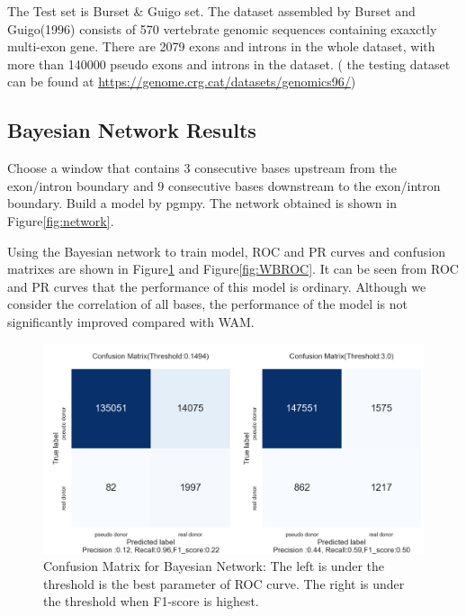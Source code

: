 \documentclass{gapd}
\begin{document}
The Test set is Burset \& Guigo set. The dataset assembled by Burset
and Guigo(1996) consists of 570 vertebrate genomic sequences containing
exaxctly multi-exon gene. There are 2079 exons and introns in the whole
dataset, with more than 140000 pseudo exons and introns in the dataset.
( the testing dataset can be found at
\url{https://genome.crg.cat/datasets/genomics96/})



\subsection{Bayesian Network Results}\label{bayesian-network-results}


Choose a window that contains 3 consecutive bases upstream from the
exon/intron boundary and 9 consecutive bases downstream to the
exon/intron boundary. Build a model by pgmpy. The network obtained is
shown in Figure\ref{fig:network}.



Using the Bayesian network to train model, ROC and PR curves and
confusion matrixes are shown in  Figure\ref{fig:BNmatrix} and Figure\ref{fig:WBROC}. It can be seen from ROC
and PR curves that the performance of this model is ordinary. Although
we consider the correlation of all bases, the performance of the model
is not significantly improved compared with WAM.


\begin{figure}[hb]
  \centering
  \includegraphics[width=\columnwidth]{assets/image-20210624154725944.png}
  \caption{Confusion Matrix for Bayesian Network: The left is under the threshold is
  the best parameter of ROC curve. The right is under the threshold when
  F1-score is highest.}
  \label{fig:BNmatrix}
\end{figure}
\end{document}

